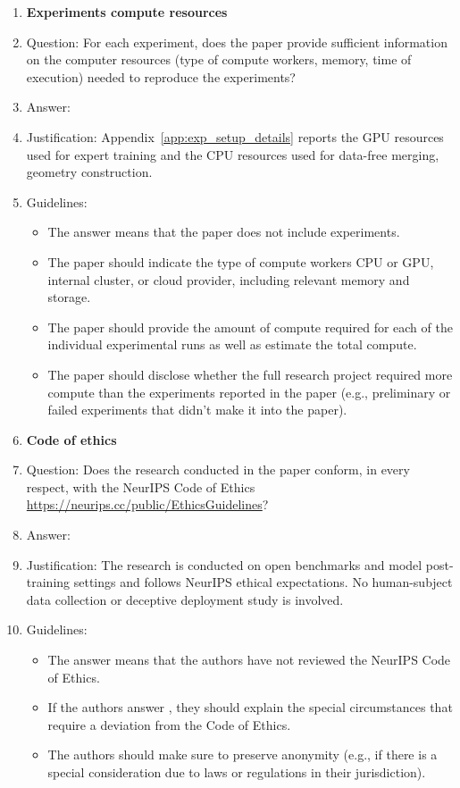 \documentclass{article}
\begin{document}
\begin{enumerate}
\item {\bf Experiments compute resources}
    \item[] Question: For each experiment, does the paper provide sufficient information on the computer resources (type of compute workers, memory, time of execution) needed to reproduce the experiments?
    \item[] Answer: \answerYes{} %
    \item[] Justification: Appendix~\ref{app:exp_setup_details} reports the GPU resources used for expert training and the CPU resources used for data-free merging, geometry construction.
    \item[] Guidelines:
    \begin{itemize}
        \item The answer \answerNA{} means that the paper does not include experiments.
        \item The paper should indicate the type of compute workers CPU or GPU, internal cluster, or cloud provider, including relevant memory and storage.
        \item The paper should provide the amount of compute required for each of the individual experimental runs as well as estimate the total compute. 
        \item The paper should disclose whether the full research project required more compute than the experiments reported in the paper (e.g., preliminary or failed experiments that didn't make it into the paper). 
    \end{itemize}
    
\item {\bf Code of ethics}
    \item[] Question: Does the research conducted in the paper conform, in every respect, with the NeurIPS Code of Ethics \url{https://neurips.cc/public/EthicsGuidelines}?
    \item[] Answer: \answerYes{} %
    \item[] Justification: The research is conducted on open benchmarks and model post-training settings and follows NeurIPS ethical expectations. No human-subject data collection or deceptive deployment study is involved.
    \item[] Guidelines:
    \begin{itemize}
        \item The answer \answerNA{} means that the authors have not reviewed the NeurIPS Code of Ethics.
        \item If the authors answer \answerNo, they should explain the special circumstances that require a deviation from the Code of Ethics.
        \item The authors should make sure to preserve anonymity (e.g., if there is a special consideration due to laws or regulations in their jurisdiction).
    \end{itemize}



\end{enumerate}
\end{document}
